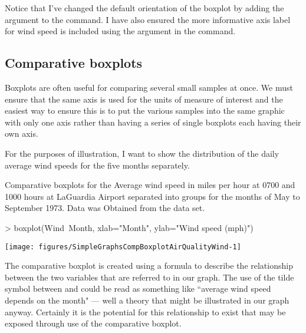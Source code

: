 Notice that I've changed the default orientation of the boxplot by adding the argument  to the  command. I have also ensured the more informative axis label for wind speed is included using the  argument in the command. 
 
\subsection{Comparative boxplots} 
 
Boxplots are often useful for comparing several small samples at once. We must ensure that the same axis is used for the units of measure of interest and the easiest way to ensure this is to put the various samples into the same graphic with only one axis rather than having a series of single boxplots each having their own axis. 
 
For the purposes of illustration, I want to show the distribution of the daily average wind speeds for the five months separately.  
\begin{exhibit} 
\begin{center} 
\caption{Comparative boxplots for the Average wind speed in miles per hour at 0700 and 1000 hours at LaGuardia Airport separated into groups for the months of May to September 1973. Data was Obtained from the  data set.} 
\label{AirQualityCompBoxplotWindMonth} 

\begin{Schunk}
\begin{Sinput}
> boxplot(Wind~Month, xlab="Month", ylab="Wind speed (mph)") 
\end{Sinput}
\end{Schunk}
\texttt{[image: figures/SimpleGraphsCompBoxplotAirQualityWind-1]} 





\end{center} 
\end{exhibit} 
The comparative boxplot is created using a formula to describe the relationship between the two variables that are referred to in our graph. The use of the tilde symbol between  and  could be read as something like ``average wind speed depends on the month" --- well a theory that might be illustrated in our graph anyway. Certainly it is the potential for this relationship to exist that may be exposed through use of the comparative boxplot. 
 
